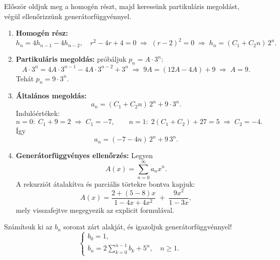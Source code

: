 \begin{solution}
Először oldjuk meg a homogén részt, majd keressünk partikuláris megoldást,
végül ellenőrizzünk generátorfüggvénnyel.
\begin{enumerate}
\item \textbf{Homogén rész:} 
\[
h_{n}=4h_{n-1}-4h_{n-2},\quad r^{2}-4r+4=0\;\Rightarrow\;(r-2)^{2}=0\;\Rightarrow\;h_{n}=(C_{1}+C_{2}n)\,2^{n}.
\]
\item \textbf{Partikuláris megoldás:} próbáljuk $p_{n}=A\cdot3^{n}$: 
\[
A\cdot3^{n}=4A\cdot3^{n-1}-4A\cdot3^{n-2}+3^{n}\;\Rightarrow\;9A=(12A-4A)+9\;\Rightarrow\;A=9.
\]
Tehát $p_{n}=9\cdot3^{n}$. 
\item \textbf{Általános megoldás:} 
\[
a_{n}=(C_{1}+C_{2}n)\,2^{n}+9\cdot3^{n}.
\]
Indulóértékek: 
\[
n=0:\;C_{1}+9=2\;\Rightarrow\;C_{1}=-7,\qquad n=1:\;2(C_{1}+C_{2})+27=5\;\Rightarrow\;C_{2}=-4.
\]
Így 
\[
\boxed{a_{n}=(-7-4n)\,2^{n}+9\,3^{n}.}
\]
\item \textbf{Generátorfüggvényes ellenőrzés:} Legyen 
\[
A(x)=\sum_{n=0}^{\infty}a_{n}x^{n}.
\]
A rekurziót átalakítva és parciális törtekre bontva kapjuk: 
\[
A(x)=\frac{2+(5-8)x}{1-4x+4x^{2}}\;+\;\frac{9x^{2}}{1-3x},
\]
mely visszafejtve megegyezik az explicit formulával. 
\end{enumerate}
\end{solution}
\begin{extraproblem}
Számítsuk ki az $b_{n}$ sorozat zárt alakját, és igazoljuk generátorfüggvénnyel!
\[
\begin{cases}
b_{0}=1,\\
b_{n}=2\sum_{k=0}^{n-1}b_{k}+5^{n},\quad n\ge1.
\end{cases}
\]
\end{extraproblem}

\vspace{1em}

